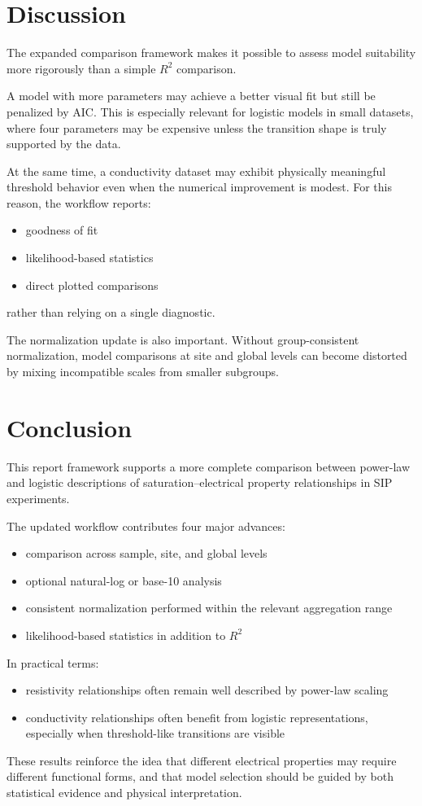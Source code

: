 \documentclass[11pt]{article}
\begin{document}
\section{Discussion}

The expanded comparison framework makes it possible to assess model suitability more rigorously than a simple $R^2$ comparison.

A model with more parameters may achieve a better visual fit but still be penalized by AIC. This is especially relevant for logistic models in small datasets, where four parameters may be expensive unless the transition shape is truly supported by the data.

At the same time, a conductivity dataset may exhibit physically meaningful threshold behavior even when the numerical improvement is modest. For this reason, the workflow reports:
\begin{itemize}[leftmargin=1.5em]
\item goodness of fit
\item likelihood-based statistics
\item direct plotted comparisons
\end{itemize}
rather than relying on a single diagnostic.

The normalization update is also important. Without group-consistent normalization, model comparisons at site and global levels can become distorted by mixing incompatible scales from smaller subgroups.

\section{Conclusion}

This report framework supports a more complete comparison between power-law and logistic descriptions of saturation--electrical property relationships in SIP experiments.

The updated workflow contributes four major advances:
\begin{itemize}[leftmargin=1.5em]
\item comparison across sample, site, and global levels
\item optional natural-log or base-10 analysis
\item consistent normalization performed within the relevant aggregation range
\item likelihood-based statistics in addition to $R^2$
\end{itemize}

In practical terms:
\begin{itemize}[leftmargin=1.5em]
\item resistivity relationships often remain well described by power-law scaling
\item conductivity relationships often benefit from logistic representations, especially when threshold-like transitions are visible
\end{itemize}

These results reinforce the idea that different electrical properties may require different functional forms, and that model selection should be guided by both statistical evidence and physical interpretation.
\end{document}
